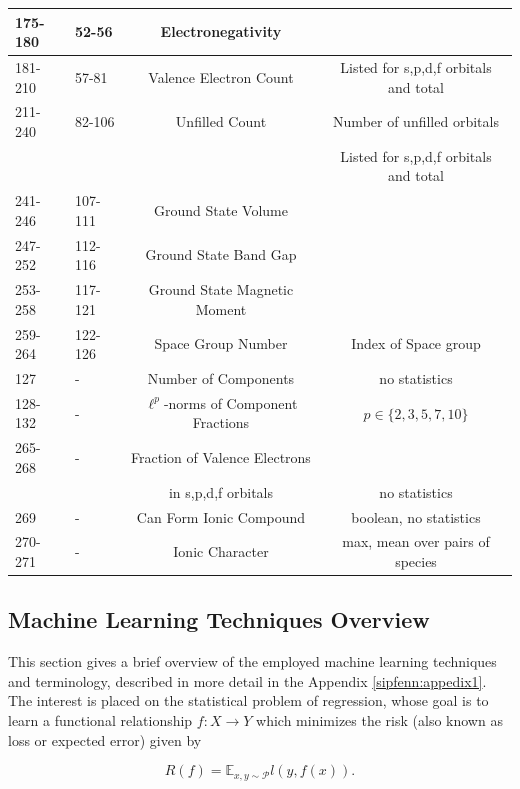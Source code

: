 \begin{table}[H]
\begin{tabular}{|p{2.25cm}|p{2cm}|c|c|}
        \hline
        175-180 & 52-56 & Electronegativity & \\ 
        \hline
        181-210 & 57-81 & Valence Electron Count & Listed for s,p,d,f orbitals and total \\ 
        \hline
        211-240 & 82-106 & Unfilled Count & Number of unfilled orbitals \\
         & & & Listed for s,p,d,f orbitals and total \\
         \hline
        241-246 & 107-111 & Ground State Volume & \\ 
        \hline
        247-252 & 112-116 & Ground State Band Gap & \\ 
        \hline
        253-258 & 117-121 & Ground State Magnetic Moment & \\ 
        \hline
        259-264 & 122-126 & Space Group Number & Index of Space group\\
        \hline
        127 & - & Number of Components & no statistics \\
        \hline
        128-132 & - & $\ell^p$-norms of Component Fractions & $p \in \{2,3,5,7,10\}$ \\
        \hline
        265-268 & - & Fraction of Valence Electrons & \\
        & & in s,p,d,f orbitals & no statistics\\
        \hline
        269 & - & Can Form Ionic Compound & boolean, no statistics\\
        \hline
        270-271 & - & Ionic Character & max, mean over pairs of species\\
        \hline
    \end{tabular}
    \label{sipfenn:feature-table}
\end{table}

\subsection{Machine Learning Techniques Overview} \label{sipfenn:ref:machinelearningoverview}
This section gives a brief overview of the employed machine learning techniques and terminology, described in more detail in the Appendix \ref{sipfenn:appedix1}. The interest is placed on the statistical problem of regression, whose goal is to learn a functional relationship $f:X\rightarrow Y$ which minimizes the risk (also known as loss or expected error) \cite{vapnik1999overview} given by

\begin{equation} \label{sipfenn:true_risk}
    R(f) = \mathbb{E}_{x,y\sim \mathcal{P}} l(y,f(x)).
\end{equation}

